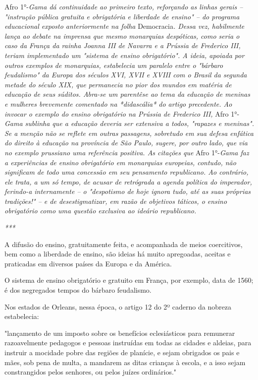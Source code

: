 Afro 1°-\emph{Gama dá continuidade ao primeiro texto, reforçando as
linhas gerais -- "instrução pública gratuita e obrigatória e liberdade
de ensino" -- do programa educacional exposto anteriormente na folha}
Democracia\emph{. Dessa vez, habilmente lança ao debate na imprensa que
mesmo monarquias despóticas, como seria o caso da França da rainha
Joanna III de Navarra e a Prússia de Frederico III, teriam implementado
um "sistema de ensino obrigatório". A ideia, apoiada por outros exemplos
de monarquias, estabelecia um paralelo entre o "bárbaro feudalismo" da
Europa dos séculos XVI, XVII e XVIII com o Brasil da segunda metade do
século XIX, que permanecia no pior dos mundos em matéria de educação de
seus súditos. Abra-se um parentêse ao tema da educação de meninas e
mulheres brevemente comentado na *didascália* do artigo precedente. Ao
invocar o exemplo do ensino obrigatório na Prússia de Frederico III,}
Afro 1°-\emph{Gama sublinha que a educação deveria ser extensiva a
todos, "rapazes e meninas". Se a menção não se reflete em outras
passagens, sobretudo em sua defesa enfática do direito à educação na
província de São Paulo, sugere, por outro lado, que via no exemplo
prussiano uma referência positiva. As citações que} Afro 1°-\emph{Gama
faz a experiências de ensino obrigatório em monarquias europeias,
contudo, não significam de todo uma concessão em seu pensamento
republicano. Ao contrário, ele trata, a um só tempo, de acusar de
retrógrada a agenda política do imperador, ferindo-a internamente -- o
"despotismo de hoje ignora tudo, até as suas próprias tradições!" -- e
de desestigmatizar, em razão de objetivos táticos, o ensino obrigatório
como uma questão exclusiva ao ideário republicano.}

\emph{***}

A difusão do ensino, gratuitamente feita, e acompanhada de meios
coercitivos, bem como a liberdade de ensino, são ideias há muito
apregoadas, aceitas e praticadas em diversos países da Europa e da
América.

O sistema de ensino obrigatório e gratuito em França, por exemplo, data
de 1560; é dos negregados tempos do bárbaro feudalismo.

Nos estados de Orleans, nessa época, o artigo 12 do 2º caderno da
nobreza estabelecia:

"lançamento de um imposto sobre os benefícios eclesiásticos para
remunerar razoavelmente pedagogos e pessoas instruídas em todas as
cidades e aldeias, para instruir a mocidade pobre das regiões de
planície, e sejam obrigados os pais e mães, sob pena de multa, a
mandarem as ditas crianças à escola, e a isso sejam constrangidos pelos
senhores, ou pelos juízes ordinários."

